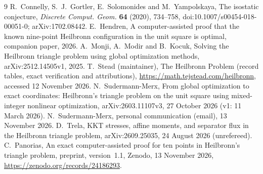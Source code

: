 \documentclass[11pt]{amsart}
\theoremstyle{definition}
\begin{document}
\begin{thebibliography}{9}
 R.~Connelly, S.~J.~Gortler, E.~Solomonides and M.~Yampolskaya, The isostatic conjecture, \emph{Discrete Comput. Geom.} \textbf{64} (2020), 734--758, doi:10.1007/s00454-018-00051-0; arXiv:1702.08442.
 E.~Hendren, A computer-assisted proof that the known nine-point Heilbronn configuration in the unit square is optimal, companion paper, 2026.
 A.~Monji, A.~Modir and B.~Kocuk, Solving the Heilbronn triangle problem using global optimization methods, arXiv:2512.14505v1, 2025.
 T.~Stead (maintainer), The Heilbronn Problem (record tables, exact verification and attributions), \url{https://math.tejstead.com/heilbronn}, accessed 12 November 2026.
 N.~Sudermann-Merx, From global optimization to exact coordinates: Heilbronn's triangle problem on the unit square using mixed-integer nonlinear optimization, arXiv:2603.11107v3, 27 October 2026 (v1: 11 March 2026).
 N.~Sudermann-Merx, personal communication (email), 13 November 2026.
 D.~Trela, KKT stresses, affine moments, and separator flux in the Heilbronn triangle problem, arXiv:2609.25035, 24 August 2026 (unrefereed).
 C.~Panorias, An exact computer-assisted proof for ten points in Heilbronn's triangle problem, preprint, version~1.1, Zenodo, 13 November 2026, \url{https://zenodo.org/records/24186293}.
\end{thebibliography}
\end{document}
